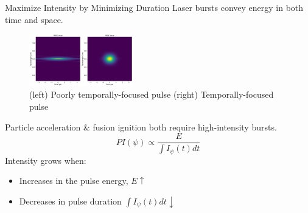 \documentclass{beamer}
\newcommand{\highlight}[1]{\textcolor{myprimary}{#1}}
\newcommand{\notebox}[1]{\colorbox{myprimary!30}{#1}}
\begin{document}
\begin{frame}{Maximize Intensity by Minimizing Duration}
    Laser bursts convey energy in both \highlight{time} and \highlight{space}.
    \begin{figure}
        \includegraphics[width=0.4\textwidth]{images/frogs.png}
        \caption{(left) Poorly temporally-focused pulse (right) Temporally-focused pulse}
    \end{figure}
    Particle acceleration \& fusion ignition both require high-intensity bursts.
    \[
        PI(\psi) \propto \frac{E}{\int I_\psi(t) dt}
    \]
    \highlight{Intensity grows when:}
    \begin{itemize}
        \item Increases in the pulse energy, $E \uparrow$
        \item Decreases in pulse duration \notebox{$\int I_\psi(t) dt \downarrow$}
    \end{itemize}
\end{frame}
\end{document}
